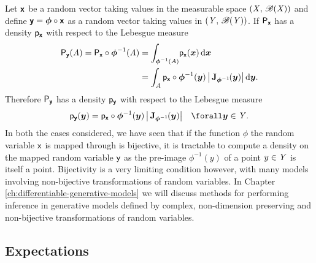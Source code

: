 Let $\boldsymbol{\mathsf{x}}$ be a random vector taking values in the measurable space $(\mathit{X},\,\mathscr{B}(\mathit{X}))$ and define $\boldsymbol{\mathsf{y}} = \boldsymbol{\phi} \circ \boldsymbol{\mathsf{x}}$ as a random vector taking values in  $(\mathit{Y},\,\mathscr{B}(\mathit{Y}))$. If $\mathsf{P}_{\boldsymbol{\mathsf{x}}}$ has a density $\mathsf{p}_{\boldsymbol{\mathsf{x}}}$ with respect to the Lebesgue measure %
\begin{equation}
\begin{split}
  \prob{\rvct{y}}(\set{A}) = \prob{\rvct{x}}\circ\vct{\phi}^{-1}(\set{A})
  &= \int_{\vct{\phi}^{-1}(\set{A})}\kern-2pt\pden{\rvct{x}}(\vct{x})\,\dr\vct{x}\\
  &= \int_{\set{A}} \pden{\rvct{x}}\circ\vct{\phi}^{-1}(\vct{y}) \,\left|\,\jacob{\vct{\phi}^{-1}}{\vct{y}}\right|\,\dr\vct{y}.
\end{split}
\end{equation}
Therefore $\mathsf{P}_{\boldsymbol{\mathsf{y}}}$ has a density $\mathsf{p}_{\boldsymbol{\mathsf{y}}}$ with respect to the Lebesgue measure 
\begin{equation}\label{eq:change-of-variables-vector-bijective}
  \pden{\rvct{y}}(\vct{y}) = 
    \pden{\rvct{x}}\circ\vct{\phi}^{-1}(\vct{y})\,
    \left|\,\jacob{\vct{\phi}^{-1}}{\vct{y}}\right|
  \quad \forall \vct{y} \in \set{Y}.
\end{equation}
In both the cases considered, we have seen that if the function $\phi$ the random variable $\mathsf{x}$ is mapped through is bijective, it is tractable to compute a density on the mapped random variable $\mathsf{y}$ as the pre-image $\phi^{-1}(y)$ of a point $y \in \mathit{Y}$ is itself a point. Bijectivity is a very limiting condition however, with many models involving non-bijective transformations of random variables. In Chapter \ref{ch:differentiable-generative-models} we will discuss methods for performing inference in generative models defined by complex, non-dimension preserving and non-bijective transformations of random variables.

\subsection{Expectations}\label{subsec:expectations}


